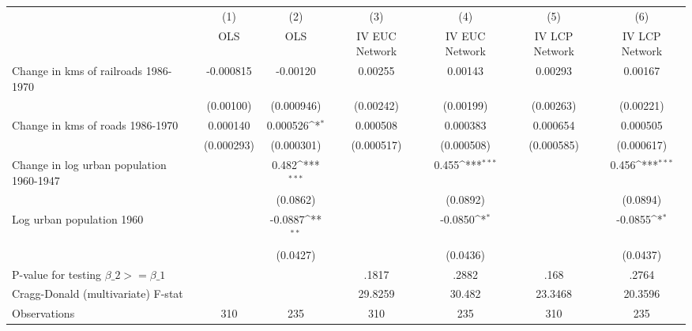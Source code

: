 {
\def\sym#1{\ifmmode^{#1}\else\(^{#1}\)\fi}
\begin{tabular}{l*{6}{c}}
\hline\hline
                &\multicolumn{1}{c}{(1)}&\multicolumn{1}{c}{(2)}&\multicolumn{1}{c}{(3)}&\multicolumn{1}{c}{(4)}&\multicolumn{1}{c}{(5)}&\multicolumn{1}{c}{(6)}\\
                &\multicolumn{1}{c}{OLS}&\multicolumn{1}{c}{OLS}&\multicolumn{1}{c}{IV EUC Network}&\multicolumn{1}{c}{IV EUC Network}&\multicolumn{1}{c}{IV LCP Network}&\multicolumn{1}{c}{IV LCP Network}\\
\hline
Change in kms of railroads 1986-1970&-0.000815         & -0.00120         &  0.00255         &  0.00143         &  0.00293         &  0.00167         \\
                &(0.00100)         &(0.000946)         &(0.00242)         &(0.00199)         &(0.00263)         &(0.00221)         \\
[1em]
Change in kms of roads 1986-1970& 0.000140         & 0.000526\sym{*}  & 0.000508         & 0.000383         & 0.000654         & 0.000505         \\
                &(0.000293)         &(0.000301)         &(0.000517)         &(0.000508)         &(0.000585)         &(0.000617)         \\
[1em]
Change in log urban population 1960-1947&                  &    0.482\sym{***}&                  &    0.455\sym{***}&                  &    0.456\sym{***}\\
                &                  & (0.0862)         &                  & (0.0892)         &                  & (0.0894)         \\
[1em]
Log urban population 1960&                  &  -0.0887\sym{**} &                  &  -0.0850\sym{*}  &                  &  -0.0855\sym{*}  \\
                &                  & (0.0427)         &                  & (0.0436)         &                  & (0.0437)         \\
\hline
P-value for testing $\beta\_{2} >= \beta\_{1}$&                  &                  &    .1817         &    .2882         &     .168         &    .2764         \\
Cragg-Donald (multivariate) F-stat&                  &                  &  29.8259         &   30.482         &  23.3468         &  20.3596         \\
Observations    &      310         &      235         &      310         &      235         &      310         &      235         \\
\hline\hline
\end{tabular}
}
